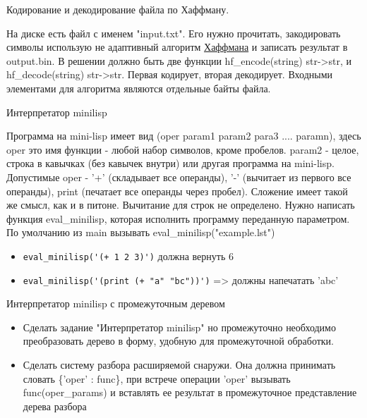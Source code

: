 \documentclass{article}
\begin{document}
\begin{center}Кодирование и декодирование файла по Хаффману.\end{center}
На диске есть файл с именем "input.txt". Его нужно прочитать, закодировать символы 
использую не адаптивный алгоритм 
\href{http://ru.wikipedia.org/wiki/%D0%9A%D0%BE%D0%B4_%D0%A5%D0%B0%D1%84%D1%84%D0%BC%D0%B0%D0%BD%D0%B0}{Хаффмана} 
и записать результат в 
output.bin. В решении должно быть две функции 
hf\_encode(string) str->str, и hf\_decode(string) str->str. Первая кодирует, вторая декодирует. 
Входными элементами для алгоритма являются отдельные байты файла.
\newpage

\begin{center} Интерпретатор minilisp \end{center}
Программа на mini-lisp имеет вид (oper param1 param2 para3 .... paramn),
здесь oper это имя функции - любой набор символов, кроме пробелов.
param2 - целое, строка в кавычках (без кавычек внутри) или другая программа на mini-lisp.
Допустимые oper - '+' (складывает все операнды), '-' (вычитает из первого все операнды), 
print (печатает все операнды через пробел). Сложение имеет такой же смысл, как и в питоне. 
Вычитание для строк не определено. Нужно написать функция eval\_minilisp, которая 
исполнить программу переданную параметром. 
По умолчанию из main вызывать eval\_minilisp("example.lst")

\begin{itemize}
    \item \lstinline!eval_minilisp('(+ 1 2 3)')! должна вернуть 6
    \item \lstinline!eval_minilisp('(print (+ "a" "bc"))')! => должны напечатать 'abc'
\end{itemize}
\newpage

\begin{center} Интерпретатор minilisp с промежуточным деревом \end{center}
\begin{itemize}
    \item Сделать задание "Интерпретатор minilisp" но промежуточно необходимо преобразовать
        дерево в форму, удобную для промежуточной обработки. 
    \item Сделать систему разбора расширяемой снаружи. Она должна принимать
        словать \{'oper' : func\}, при встрече операции 'oper' вызывать func(oper\_params)
        и вставлять ее результат в промежуточное представление дерева разбора
\end{itemize}
\newpage
\end{document}
